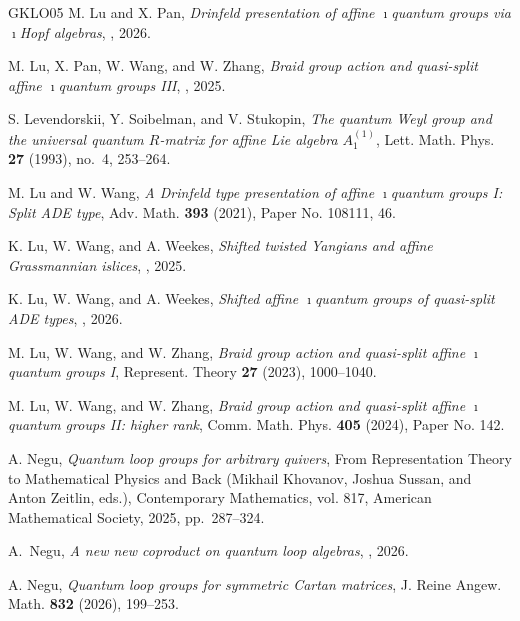 \documentclass[reqno]{amsart}
\numberwithin{equation}{section}
\begin{document}
\begin{thebibliography}{GKLO05}
M. Lu and X. Pan, \emph{{D}rinfeld presentation of affine
	{$\imath$}quantum groups via {$\imath$}{H}opf algebras},
, 2026.

M. Lu, X. Pan, W. Wang, and W. Zhang, \emph{Braid group
	action and quasi-split affine {$\imath$}quantum groups {III}},
, 2025.

S. Levendorskii, Y. Soibelman, and V. Stukopin, \emph{The quantum
	{W}eyl group and the universal quantum {$R$}-matrix for affine {L}ie algebra
	{$A^{(1)}_1$}}, Lett. Math. Phys. \textbf{27} (1993), no.~4, 253--264.

M. Lu and W. Wang, \emph{A {D}rinfeld type presentation of affine
	{$\imath$}quantum groups {I}: {S}plit {ADE} type}, Adv. Math. \textbf{393}
(2021), Paper No. 108111, 46. 

K. Lu, W. Wang, and A. Weekes, \emph{Shifted twisted {Y}angians and
	affine {G}rassmannian islices},
, 2025.

K. Lu, W. Wang, and A. Weekes, \emph{Shifted affine $\imath$quantum groups of quasi-split {ADE}
	types}, , 2026.

M. Lu, W. Wang, and W. Zhang, \emph{Braid group action and
	quasi-split affine {$\imath$}quantum groups {I}}, Represent. Theory
\textbf{27} (2023), 1000--1040.

M. Lu, W. Wang, and W. Zhang, \emph{Braid group action and quasi-split affine {$\imath$}quantum
	groups {II}: higher rank}, Comm. Math. Phys. \textbf{405} (2024), Paper No.
142.

A. Negu{}, \emph{Quantum loop groups for arbitrary quivers}, From
Representation Theory to Mathematical Physics and Back (Mikhail Khovanov,
Joshua Sussan, and Anton Zeitlin, eds.), Contemporary Mathematics, vol. 817,
American Mathematical Society, 2025, pp.~287--324.

A.~Negu, \emph{A new new coproduct on quantum loop algebras},
, 2026.

A. Negu{}, \emph{Quantum loop groups for symmetric {C}artan matrices},
J. Reine Angew. Math. \textbf{832} (2026), 199--253.


\end{thebibliography}
\end{document}
